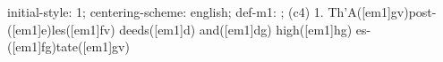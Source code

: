 initial-style: 1;
centering-scheme: english;
def-m1: \grealign;
(c4) 1. Th'A([em1]gv)post-([em1]e)les([em1]fv) deeds([em1]d) and([em1]dg) high([em1]hg) es-([em1]fg)tate([em1]gv)